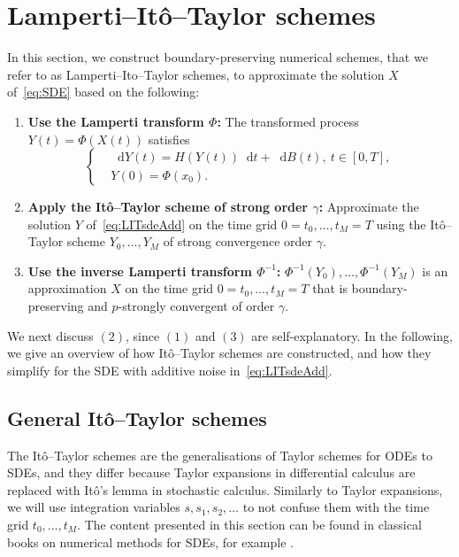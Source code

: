 \documentclass[11pt]{amsart}
\newcommand*\diff{\mathop{}\!\mathrm{d}}
\begin{document}
{\section{Lamperti--Itô--Taylor schemes}\label{sec:num_schemes}
In this section, we construct boundary-preserving numerical schemes, that we refer to as Lamperti--Ito--Taylor schemes, to approximate the solution $X$ of~\eqref{eq:SDE} based on the following:
\begin{enumerate}
\item \textbf{Use the Lamperti transform $\Phi$:} The transformed process $Y(t) = \Phi(X(t))$ satisfies 
\begin{equation}\label{eq:LITsdeAdd}
\left\lbrace
\begin{aligned}
& \diff Y(t) = H(Y(t)) \diff t + \diff B(t),\ t \in [0,T],\\
& Y(0) = \Phi(x_{0}).
\end{aligned}
\right.
\end{equation}
\item \textbf{Apply the Itô--Taylor scheme of strong order $\gamma$:} Approximate the solution $Y$ of~\eqref{eq:LITsdeAdd} on the time grid $0=t_{0},\ldots,t_{M}=T$ using the Itô--Taylor scheme $Y_{0},\ldots,Y_{M}$ of strong convergence order $\gamma$.
\item \textbf{Use the inverse Lamperti transform $\Phi^{-1}$:} $\Phi^{-1}(Y_{0}),\ldots,\Phi^{-1}(Y_{M})$ is an approximation $X$ on the time grid $0=t_{0},\ldots,t_{M}=T$ that is boundary-preserving and $p$-strongly convergent of order $\gamma$.
\end{enumerate}
We next discuss $(2)$, since $(1)$ and $(3)$ are self-explanatory. In the following, we give an overview of how Itô--Taylor schemes are constructed, and how they simplify for the SDE with additive noise in~\eqref{eq:LITsdeAdd}.

\subsection{General Itô--Taylor schemes}\label{sec:IT_general}
The Itô--Taylor schemes are the generalisations of Taylor schemes for ODEs to SDEs, and they differ because Taylor expansions in differential calculus are replaced with Itô's lemma in stochastic calculus. Similarly to Taylor expansions, we will use integration variables $s, s_{1},s_{2},\ldots$ to not confuse them with the time grid $t_{0},\ldots,t_{M}$. The content presented in this section can be found in classical books on numerical methods for SDEs, for example \cite{MR1214374}.

}
\end{document}
